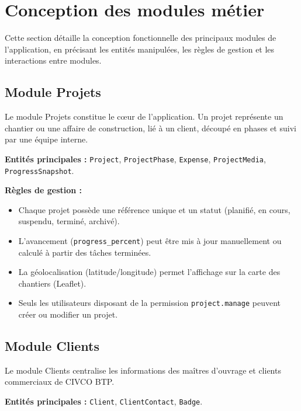 \section{Conception des modules métier}

Cette section détaille la conception fonctionnelle des principaux modules de
l'application, en précisant les entités manipulées, les règles de gestion et les
interactions entre modules.

\subsection{Module Projets}

Le module Projets constitue le cœur de l'application. Un projet représente un chantier
ou une affaire de construction, lié à un client, découpé en phases et suivi par une
équipe interne.

\medskip

\textbf{Entités principales :} \texttt{Project}, \texttt{ProjectPhase}, \texttt{Expense},
\texttt{ProjectMedia}, \texttt{ProgressSnapshot}.

\medskip

\textbf{Règles de gestion :}
\begin{itemize}
  \item Chaque projet possède une référence unique et un statut (planifié, en cours,
  suspendu, terminé, archivé).
  \item L'avancement (\texttt{progress\_percent}) peut être mis à jour manuellement
  ou calculé à partir des tâches terminées.
  \item La géolocalisation (latitude/longitude) permet l'affichage sur la carte des
  chantiers (Leaflet).
  \item Seuls les utilisateurs disposant de la permission \texttt{project.manage}
  peuvent créer ou modifier un projet.
\end{itemize}

\subsection{Module Clients}

Le module Clients centralise les informations des maîtres d'ouvrage et clients
commerciaux de CIVCO BTP.

\medskip

\textbf{Entités principales :} \texttt{Client}, \texttt{ClientContact}, \texttt{Badge}.

